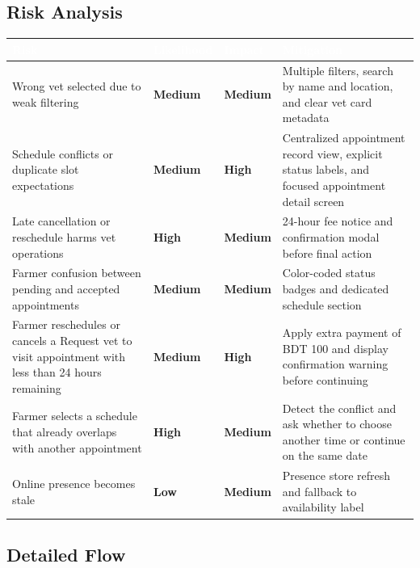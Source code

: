 \documentclass[12pt]{article}
\begin{document}
\subsection{Risk Analysis}

\begin{longtable}{|p{3.8cm}|p{2.5cm}|p{2.5cm}|p{4cm}|}
\hline
\rowcolor{headerblue}\textcolor{white}{\textbf{Risk}} & \textcolor{white}{\textbf{Likelihood}} & \textcolor{white}{\textbf{Impact}} & \textcolor{white}{\textbf{Mitigation}} \\
\hline
Wrong vet selected due to weak filtering & \textcolor{medrisk}{\textbf{Medium}} & \textcolor{medrisk}{\textbf{Medium}} & Multiple filters, search by name and location, and clear vet card metadata \\
\hline
\rowcolor{rowgray}
Schedule conflicts or duplicate slot expectations & \textcolor{medrisk}{\textbf{Medium}} & \textcolor{highrisk}{\textbf{High}} & Centralized appointment record view, explicit status labels, and focused appointment detail screen \\
\hline
Late cancellation or reschedule harms vet operations & \textcolor{highrisk}{\textbf{High}} & \textcolor{medrisk}{\textbf{Medium}} & 24-hour fee notice and confirmation modal before final action \\
\hline
\rowcolor{rowgray}
Farmer confusion between pending and accepted appointments & \textcolor{medrisk}{\textbf{Medium}} & \textcolor{medrisk}{\textbf{Medium}} & Color-coded status badges and dedicated schedule section \\
\hline
Farmer reschedules or cancels a Request vet to visit appointment with less than 24 hours remaining & \textcolor{medrisk}{\textbf{Medium}} & \textcolor{highrisk}{\textbf{High}} & Apply extra payment of BDT 100 and display confirmation warning before continuing \\
\hline
\rowcolor{rowgray}
Farmer selects a schedule that already overlaps with another appointment & \textcolor{highrisk}{\textbf{High}} & \textcolor{medrisk}{\textbf{Medium}} & Detect the conflict and ask whether to choose another time or continue on the same date \\
\hline
Online presence becomes stale & \textcolor{lowrisk}{\textbf{Low}} & \textcolor{medrisk}{\textbf{Medium}} & Presence store refresh and fallback to availability label \\
\hline
\end{longtable}

\subsection{Detailed Flow}
\end{document}
